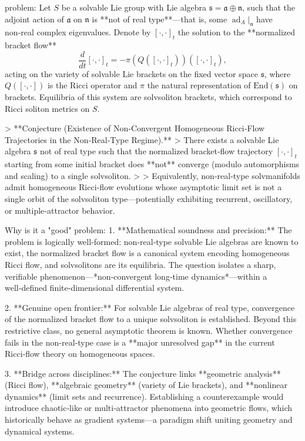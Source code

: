 problem:  
Let \( S \) be a solvable Lie group with Lie algebra \( \mathfrak{s} = \mathfrak{a}\oplus\mathfrak{n} \), such that the adjoint action of \( \mathfrak{a} \) on \( \mathfrak{n} \) is **not of real type**—that is, some \( \operatorname{ad}_A|_{\mathfrak{n}} \) have non‑real complex eigenvalues.  
Denote by \( [\cdot,\cdot]_t \) the solution to the **normalized bracket flow**
\[
\frac{d}{dt}[\cdot,\cdot]_t = -\pi(Q([\cdot,\cdot]_t))([\cdot,\cdot]_t),
\]
acting on the variety of solvable Lie brackets on the fixed vector space \( \mathfrak{s} \), where \( Q([\cdot,\cdot]) \) is the Ricci operator and \( \pi \) the natural representation of \( \mathrm{End}(\mathfrak{s}) \) on brackets.  
Equilibria of this system are solvsoliton brackets, which correspond to Ricci soliton metrics on \( S \).

> **Conjecture (Existence of Non‑Convergent Homogeneous Ricci‑Flow Trajectories in the Non‑Real‑Type Regime).**  
> There exists a solvable Lie algebra \( \mathfrak{s} \) not of real type such that the normalized bracket‑flow trajectory \( [\cdot,\cdot]_t \) starting from some initial bracket does **not** converge (modulo automorphisms and scaling) to a single solvsoliton.  
>  
> Equivalently, non‑real‑type solvmanifolds admit homogeneous Ricci‑flow evolutions whose asymptotic limit set is not a single orbit of the solvsoliton type—potentially exhibiting recurrent, oscillatory, or multiple‑attractor behavior.

Why is it a "good" problem:  
1. **Mathematical soundness and precision:**  
   The problem is logically well‑formed: non‑real‑type solvable Lie algebras are known to exist, the normalized bracket flow is a canonical system encoding homogeneous Ricci flow, and solvsolitons are its equilibria. The question isolates a sharp, verifiable phenomenon—*non‑convergent long‑time dynamics*—within a well‑defined finite‑dimensional differential system.

2. **Genuine open frontier:**  
   For solvable Lie algebras of real type, convergence of the normalized bracket flow to a unique solvsoliton is established. Beyond this restrictive class, no general asymptotic theorem is known. Whether convergence fails in the non‑real‑type case is a **major unresolved gap** in the current Ricci‑flow theory on homogeneous spaces.

3. **Bridge across disciplines:**  
   The conjecture links **geometric analysis** (Ricci flow), **algebraic geometry** (variety of Lie brackets), and **nonlinear dynamics** (limit sets and recurrence). Establishing a counterexample would introduce chaotic‑like or multi‑attractor phenomena into geometric flows, which historically behave as gradient systems—a paradigm shift uniting geometry and dynamical systems.

